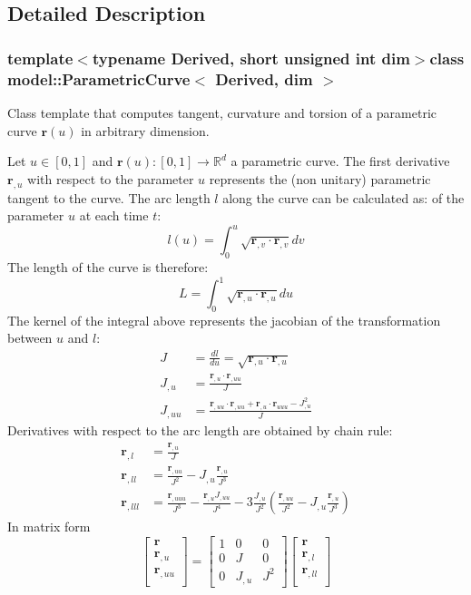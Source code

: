 \subsection{Detailed Description}
\subsubsection*{template$<$typename Derived, short unsigned int dim$>$class model\+::\+Parametric\+Curve$<$ Derived, dim $>$}

Class template that computes tangent, curvature and torsion of a parametric curve $\mathbf{r}(u)$ in arbitrary dimension. 

Let $u\in[0,1]$ and $\mathbf{r}(u): [0,1]\rightarrow \mathbb{R}^d$ a parametric curve. The first derivative $\mathbf{r}_{,u}$ with respect to the parameter $u$ represents the (non unitary) parametric tangent to the curve. The arc length $l$ along the curve can be calculated as\+: of the parameter $u$ at each time $t$\+: \[ l(u)=\int_0^u\sqrt{\mathbf{r}_{,v}\cdot\mathbf{r}_{,v}}dv \] The length of the curve is therefore\+: \[ L=\int_0^1\sqrt{\mathbf{r}_{,u}\cdot\mathbf{r}_{,u}}du \] The kernel of the integral above represents the jacobian of the transformation between $ u $ and $ l $\+: \[ \begin{eqnarray} J&=\frac{d l}{d u}=\sqrt{\mathbf{r}_{,u}\cdot\mathbf{r}_{,u}} \\ J_{,u}&=\frac{\mathbf{r}_{,u}\cdot\mathbf{r}_{,uu}}{J}\\ J_{,uu}&=\frac{\mathbf{r}_{,uu}\cdot\mathbf{r}_{,uu}+\mathbf{r}_{,u}\cdot\mathbf{r}_{uuu}-J^2_{,u}}{J} \end{eqnarray} \] Derivatives with respect to the arc length are obtained by chain rule\+: \[ \begin{eqnarray} \mathbf{r}_{,l}&=\frac{\mathbf{r}_{,u}}{J}\\ \mathbf{r}_{,ll}&=\frac{\mathbf{r}_{,uu}}{J^2}-J_{,u}\frac{\mathbf{r}_{,u}}{J^3}\\ \mathbf{r}_{,lll}&=\frac{\mathbf{r}_{,uuu}}{J^3}-\frac{\mathbf{r}_{,u}J_{,uu}}{J^4}-3\frac{J_{,u}}{J^2}\left(\frac{\mathbf{r}_{,uu}}{J^2}-J_{,u}\frac{\mathbf{r}_{,u}}{J^3}\right) \end{eqnarray} \] In matrix form \[ \left[ \begin{array}{c} \mathbf{r}\\ \mathbf{r}_{,u}\\ \mathbf{r}_{,uu}\\ \end{array}\right]= \left[ \begin{array}{ccc} 1&0&0\\ 0&J&0\\ 0&J_{,u}&J^2 \end{array}\right] \left[ \begin{array}{c} \mathbf{r}\\ \mathbf{r}_{,l}\\ \mathbf{r}_{,ll}\\ \end{array}\right] \]

